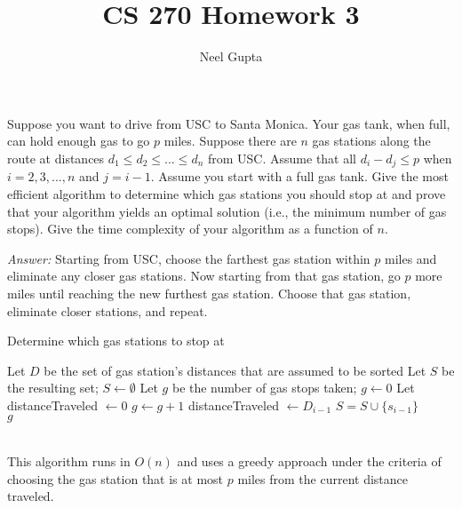 \documentclass[12pt]{article}
\newenvironment{problem}[2][Problem]{\begin{trivlist}
\item[\hskip \labelsep {\bfseries #1}\hskip \labelsep {\bfseries #2.}]}{\end{trivlist}}
\begin{document}

\title{\vspace{-4.1cm}CS 270 Homework 3}
\author{Neel Gupta} 
\maketitle

\begin{problem}{1}
Suppose you want to drive from USC to Santa Monica. Your gas tank, when full, can hold enough gas to go $p$ miles. Suppose there are $n$ gas stations along the route at distances $d_1 \leq d_2 \leq ... \leq d_n$ from USC. Assume that all $d_i - d_j \leq p$ when $i = 2,3,...,n$ and $j=i-1$. Assume you start with a full gas tank. Give the most efficient algorithm to determine which gas stations you should stop at and prove that your algorithm yields an optimal solution (i.e., the minimum number of gas stops). Give the time complexity of your algorithm as a function of $n$.
\end{problem}
\textit{Answer:}
Starting from USC, choose the farthest gas station within $p$ miles and eliminate any closer gas stations. Now starting from that gas station, go $p$ more miles until reaching the new furthest gas station. Choose that gas station, eliminate closer stations, and repeat.
\begin{algorithm}
	\caption{Determine which gas stations to stop at}
\begin{algorithmic}
	\State Let $D$ be the set of gas station's distances that are assumed to be sorted
	\State Let $S$ be the resulting set; $S \gets \emptyset$
	\State Let $g$ be the number of gas stops taken; $g\gets0$
	\State Let distanceTraveled $\gets 0$
			\State $g\gets g+1$
			\State distanceTraveled $\gets D_{i-1}$
			\State $S=S \cup \{s_{i-1}\}$
		\EndIf
	\EndFor \\
	\Return $g$
	\EndProcedure
\end{algorithmic}
\end{algorithm} \\
This algorithm runs in $O(n)$ and uses a greedy approach under the criteria of choosing the gas station that is at most $p$ miles from the current distance traveled.\\
\end{document}

